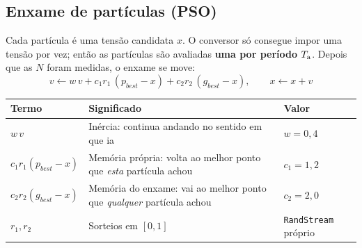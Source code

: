 \subsection{Enxame de part\'iculas (PSO)}

Cada part\'icula \'e uma tens\~ao candidata $x$. O conversor s\'o consegue impor uma tens\~ao por vez; ent\~ao as part\'iculas s\~ao
avaliadas \textbf{uma por per\'iodo $T_{\mathrm{a}}$}. Depois que as $N$ foram medidas, o enxame se move:
\begin{equation}\label{eq:pso}
v\leftarrow w\,v+c_1r_1\,(p_{best}-x)+c_2r_2\,(g_{best}-x),\qquad x\leftarrow x+v
\end{equation}
\begin{center}\small
\begin{tabularx}{\textwidth}{@{}l>{\raggedright\arraybackslash}Xl@{}}
\toprule
Termo & Significado & Valor \\ \midrule
$w\,v$ & In\'ercia: continua andando no sentido em que ia & $w=0{,}4$ \\
$c_1r_1(p_{best}-x)$ & Mem\'oria pr\'opria: volta ao melhor ponto que \emph{esta} part\'icula achou & $c_1=1{,}2$ \\
$c_2r_2(g_{best}-x)$ & Mem\'oria do enxame: vai ao melhor ponto que \emph{qualquer} part\'icula achou & $c_2=2{,}0$ \\
$r_1,r_2$ & Sorteios em $[0,1]$ & \texttt{RandStream} pr\'oprio \\
\bottomrule
\end{tabularx}
\end{center}

